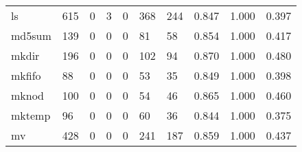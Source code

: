 \begin{longtable}{lp{1.3cm}p{1.3cm}p{1.3cm}p{1.3cm}p{1.3cm}p{1.3cm}p{1.3cm}p{1.3cm}p{1.3cm}}
ls        &                    615 &                                             0 &                                            3 &                                           0 &                                          368 &                                        244 &                                0.847 &                                  1.000 &                                0.397 \\
md5sum    &                    139 &                                             0 &                                            0 &                                           0 &                                           81 &                                         58 &                                0.854 &                                  1.000 &                                0.417 \\
mkdir     &                    196 &                                             0 &                                            0 &                                           0 &                                          102 &                                         94 &                                0.870 &                                  1.000 &                                0.480 \\
mkfifo    &                     88 &                                             0 &                                            0 &                                           0 &                                           53 &                                         35 &                                0.849 &                                  1.000 &                                0.398 \\
mknod     &                    100 &                                             0 &                                            0 &                                           0 &                                           54 &                                         46 &                                0.865 &                                  1.000 &                                0.460 \\
mktemp    &                     96 &                                             0 &                                            0 &                                           0 &                                           60 &                                         36 &                                0.844 &                                  1.000 &                                0.375 \\
mv        &                    428 &                                             0 &                                            0 &                                           0 &                                          241 &                                        187 &                                0.859 &                                  1.000 &                                0.437 \\

\end{longtable}
